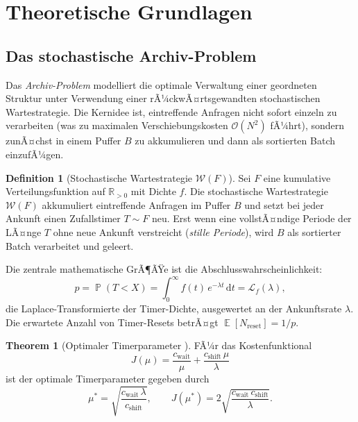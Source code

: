 ﻿\documentclass[a4paper,12pt]{scrreprt}
\theoremstyle{definition}
\newtheorem{definition}{Definition}[section]
\newtheorem{theorem}{Theorem}[section]
\DeclareMathOperator{\E}{\mathbb{E}}
\DeclareMathOperator{\Prob}{\mathbb{P}}
\begin{document}
	\section{Theoretische Grundlagen}
	
	\subsection{Das stochastische Archiv-Problem}
	
	Das \emph{Archiv-Problem} \cite{epp2026archiv} modelliert die optimale
	Verwaltung einer geordneten Struktur unter Verwendung einer
	rÃ¼ckwÃ¤rtsgewandten stochastischen Wartestrategie. Die Kernidee ist,
	eintreffende Anfragen nicht sofort einzeln zu verarbeiten (was zu
	maximalen Verschiebungskosten $\mathcal{O}(N^2)$ fÃ¼hrt), sondern
	zunÃ¤chst in einem Puffer $B$ zu akkumulieren und dann als sortierten
	Batch einzufÃ¼gen.
	
	\begin{definition}[Stochastische Wartestrategie $\mathcal{W}(F)$]
		\label{def:waitstrat}
		Sei $F$ eine kumulative Verteilungsfunktion auf $\mathbb{R}_{>0}$ mit
		Dichte $f$. Die stochastische Wartestrategie $\mathcal{W}(F)$ akkumuliert
		eintreffende Anfragen im Puffer $B$ und setzt bei jeder Ankunft einen
		Zufallstimer $T \sim F$ neu. Erst wenn eine vollstÃ¤ndige Periode der
		LÃ¤nge $T$ ohne neue Ankunft verstreicht (\emph{stille Periode}), wird
		$B$ als sortierter Batch verarbeitet und geleert.
	\end{definition}
	
	Die zentrale mathematische GrÃ¶ÃŸe ist die Abschlusswahrscheinlichkeit:
	\begin{equation}
		p = \Prob(T < X) = \int_0^\infty f(t)\,e^{-\lambda t}\,\mathrm{d}t
		= \mathcal{L}_f(\lambda),
		\label{eq:abschluss}
	\end{equation}
	die Laplace-Transformierte der Timer-Dichte, ausgewertet an der
	Ankunftsrate $\lambda$. Die erwartete Anzahl von Timer-Resets betrÃ¤gt
	$\E[N_{\text{reset}}] = 1/p$.
	
	\begin{theorem}[Optimaler Timerparameter \cite{epp2026archiv}]
		\label{thm:optmu}
		FÃ¼r das Kostenfunktional
		\begin{equation}
			J(\mu) = \frac{c_{\mathrm{wait}}}{\mu} + \frac{c_{\mathrm{shift}}\,\mu}{\lambda}
			\label{eq:cost}
		\end{equation}
		ist der optimale Timerparameter gegeben durch
		\begin{equation}
			\mu^* = \sqrt{\frac{c_{\mathrm{wait}}\,\lambda}{c_{\mathrm{shift}}}},
			\qquad
			J(\mu^*) = 2\sqrt{\frac{c_{\mathrm{wait}}\,c_{\mathrm{shift}}}{\lambda}}.
			\label{eq:muopt}
		\end{equation}
	\end{theorem}
	
\end{document}
